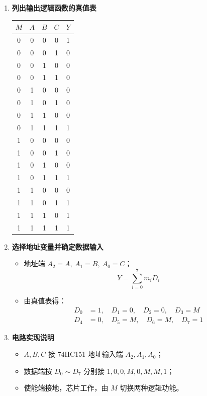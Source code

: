 \begin{enumerate}
    \item \textbf{列出输出逻辑函数的真值表}
    \begin{center}
    \begin{tabular}{cccc|c}
        \toprule
        $M$ & $A$ & $B$ & $C$ & $Y$ \\
        \midrule
        0 & 0 & 0 & 0 & 1 \\
        0 & 0 & 0 & 1 & 0 \\
        0 & 0 & 1 & 0 & 0 \\
        0 & 0 & 1 & 1 & 0 \\
        0 & 1 & 0 & 0 & 0 \\
        0 & 1 & 0 & 1 & 0 \\
        0 & 1 & 1 & 0 & 0 \\
        0 & 1 & 1 & 1 & 1 \\
        1 & 0 & 0 & 0 & 0 \\
        1 & 0 & 0 & 1 & 0 \\
        1 & 0 & 1 & 0 & 0 \\
        1 & 0 & 1 & 1 & 1 \\
        1 & 1 & 0 & 0 & 0 \\
        1 & 1 & 0 & 1 & 1 \\
        1 & 1 & 1 & 0 & 1 \\
        1 & 1 & 1 & 1 & 1 \\
        \bottomrule
    \end{tabular}
    \end{center}

    \item \textbf{选择地址变量并确定数据输入}
    \begin{itemize}
        \item 地址端 $A_2=A,\ A_1=B,\ A_0=C$；
        \[
        Y = \sum_{i=0}^{7} m_i D_i
        \]
        \item 由真值表得：
        \[
        \begin{aligned}
        D_0 &= 1,\quad D_1 = 0,\quad D_2 = 0,\quad D_3 = M \\
        D_4 &= 0,\quad D_5 = M,\quad D_6 = M,\quad D_7 = 1
        \end{aligned}
        \]
    \end{itemize}

    \item \textbf{电路实现说明}
    \begin{itemize}
        \item $A,B,C$ 接 74HC151 地址输入端 $A_2,A_1,A_0$；
        \item 数据端按 $D_0\sim D_7$ 分别接 $1,0,0,M,0,M,M,1$；
        \item 使能端接地，芯片工作，由 $M$ 切换两种逻辑功能。
    \end{itemize}
\end{enumerate}